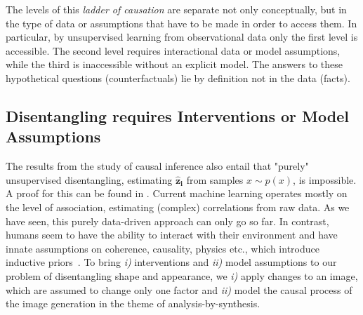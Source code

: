 		The levels of this \textit{ladder of causation} \cite{pearl18why, pearl18impediments} are separate not only conceptually, but in the type of data or assumptions that have to be made in order to access them. In particular, by unsupervised learning from observational data only the first level is accessible. The second level requires interactional data or model assumptions, while the third is inaccessible without an explicit model. The answers to these hypothetical questions (counterfactuals) lie by definition not in the data (facts).




	\subsection{Disentangling requires Interventions or Model Assumptions}\label{sec:requirements}
		The results from the study of causal inference also entail that "purely" unsupervised disentangling, \ie estimating $\mathbf{\hat z_i}$ from samples $x \sim p(x)$, is impossible. A proof for this can be found in \cite{locatello18challenging}.
		Current machine learning operates mostly on the level of association, estimating (complex) correlations from raw data.
		As we have seen, this purely data-driven approach can only go so far.
		In contrast, humans seem to have the ability to interact with their environment and have innate assumptions on coherence, causality, physics etc., which introduce inductive priors~\cite{tenenbaum18think}.
		To bring \emph{i)} interventions and \emph{ii)} model assumptions to our problem of disentangling shape and appearance, we \emph{i)} apply changes to an image, which are assumed to change only one factor and \emph{ii)} model the causal process of the image generation in the theme of analysis-by-synthesis.
%
%
%


